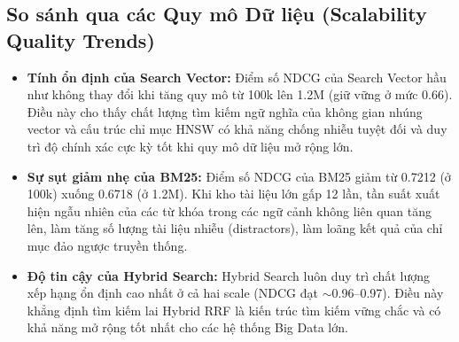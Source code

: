 \subsection{So sánh qua các Quy mô Dữ liệu (Scalability Quality Trends)}
\begin{itemize}
    \item \textbf{Tính ổn định của Search Vector:} Điểm số NDCG của Search Vector hầu như không thay đổi khi tăng quy mô từ 100k lên 1.2M (giữ vững ở mức 0.66). Điều này cho thấy chất lượng tìm kiếm ngữ nghĩa của không gian nhúng vector và cấu trúc chỉ mục HNSW có khả năng chống nhiễu tuyệt đối và duy trì độ chính xác cực kỳ tốt khi quy mô dữ liệu mở rộng lớn.
    \item \textbf{Sự sụt giảm nhẹ của BM25:} Điểm số NDCG của BM25 giảm từ 0.7212 (ở 100k) xuống 0.6718 (ở 1.2M). Khi kho tài liệu lớn gấp 12 lần, tần suất xuất hiện ngẫu nhiên của các từ khóa trong các ngữ cảnh không liên quan tăng lên, làm tăng số lượng tài liệu nhiễu (distractors), làm loãng kết quả của chỉ mục đảo ngược truyền thống.
    \item \textbf{Độ tin cậy của Hybrid Search:} Hybrid Search luôn duy trì chất lượng xếp hạng ổn định cao nhất ở cả hai scale (NDCG đạt $\sim$0.96--0.97). Điều này khẳng định tìm kiếm lai Hybrid RRF là kiến trúc tìm kiếm vững chắc và có khả năng mở rộng tốt nhất cho các hệ thống Big Data lớn.
\end{itemize}
